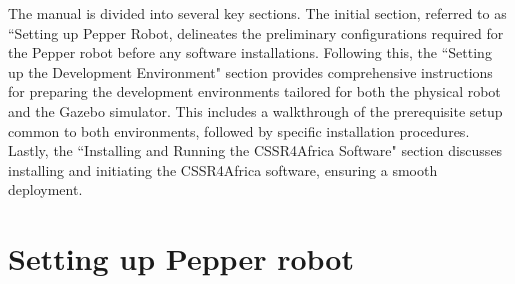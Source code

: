 \documentclass{CSSRforAfrica}
\begin{document}
The manual is divided into several key sections. The initial section, referred to as ``Setting up Pepper Robot, delineates the preliminary configurations required for the Pepper robot before any software installations. Following this, the ``Setting up the Development Environment" section provides comprehensive instructions for preparing the development environments tailored for both the physical robot and the Gazebo simulator. This includes a walkthrough of the prerequisite setup common to both environments, followed by specific installation procedures. Lastly, the ``Installing and Running the CSSR4Africa Software" section discusses installing and initiating the CSSR4Africa software, ensuring a smooth deployment.

\newpage

\section{Setting up Pepper robot}
\end{document}
